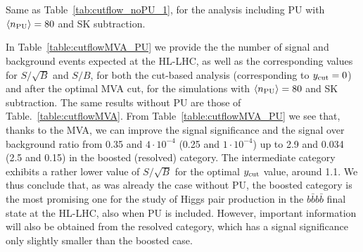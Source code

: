 \begin{table}[t]
  \centering
  \scriptsize
  
  $\,$ \\
  \vspace{0.5cm}
  
  $\,$ \\
  \vspace{0.5cm}
    
    \caption{\small
      Same as Table~\ref{tab:cutflow_noPU_1}, for the analysis
      including PU with $\left\langle n_{\rm PU}\right\rangle=80$ and SK subtraction.
      \label{tab:cutflow_SKPU80_1}}
\end{table}


In Table~\ref{table:cutflowMVA_PU}
we provide the  the number of signal and
    background events expected
    at the HL-LHC, as well as the
    corresponding values for $S/\sqrt{B}$ and $S/B$,
    for both the cut-based analysis (corresponding
    to $y_{\rm cut}=0$) and after the
    optimal MVA cut, for the simulations
    with $\left\langle n_{\rm PU}\right\rangle=80$
    and SK subtraction.
    The same results without PU are those of
    Table.~\ref{table:cutflowMVA}.
    From Table~\ref{table:cutflowMVA_PU} we see that, thanks
to the MVA, we can improve the signal significance and the
signal over background ratio from 0.35 and $4\cdot 10^{-4}$
(0.25 and $1\cdot 10^{-4}$) up to 2.9 and 0.034 (2.5 and 0.15)
in the boosted (resolved) category.
%
The intermediate category exhibits a rather lower value of $S/\sqrt{B}$
for the optimal $y_{\rm cut}$ value, around 1.1.
%
We thus conclude that, as was already the case
without PU,
the boosted category is the most promising
one for the study of Higgs pair production in the $b\bar{b}b\bar{b}$
final state
at the HL-LHC, also when PU is included.
%
However, important information will also be obtained from
the resolved category, which has a signal significance
only slightly smaller than the boosted case.


